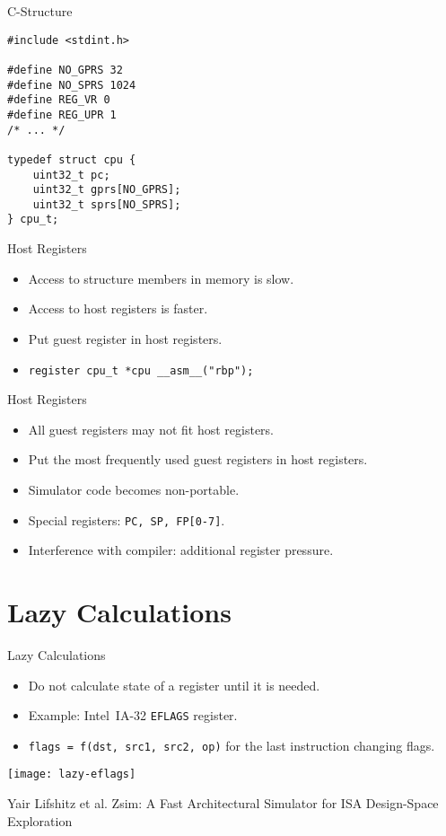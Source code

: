 \begin{frame}[fragile]{C-Structure}
\begin{lstlisting}
#include <stdint.h>

#define NO_GPRS 32
#define NO_SPRS 1024
#define REG_VR 0
#define REG_UPR 1
/* ... */

typedef struct cpu {
    uint32_t pc;
    uint32_t gprs[NO_GPRS];
    uint32_t sprs[NO_SPRS];
} cpu_t;
\end{lstlisting}
\end{frame}

\begin{frame}{Host Registers}
\begin{itemize}
\item Access to structure members in memory is slow.
\item Access to host registers is faster.
\item Put guest register in host registers.
\item \texttt{register cpu_t *cpu __asm__("rbp");}
\end{itemize}
\end{frame}

\begin{frame}{Host Registers}
\begin{itemize}
\item All guest registers may not fit host registers.
\item Put the most frequently used guest registers in host registers.
\item Simulator code becomes non-portable.
\item Special registers: \texttt{PC, SP, FP[0-7]}.
\item Interference with compiler: additional register pressure.
\end{itemize}
\end{frame}

\section{Lazy Calculations}

\begin{frame}{Lazy Calculations}
\begin{itemize}
\item Do not calculate state of a register until it is needed.
\item Example: Intel\reg~IA-32 \texttt{EFLAGS} register.
\item \texttt{flags = f(dst, src1, src2, op)} for the last instruction changing
  flags.
\end{itemize}
\vfill
\centering
\texttt{[image: lazy-eflags]}

\tiny{Yair Lifshitz et al. Zsim: A Fast Architectural Simulator for ISA Design-Space Exploration}
\end{frame}

